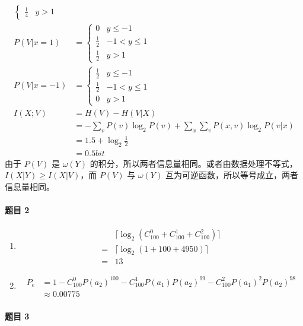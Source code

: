 \documentclass{ctexart}
\begin{document}
\begin{enumerate}
\begin{align}
\begin{cases}
            \frac{1}{4} & y > 1
        \end{cases} \\
        P(V|x=1) &= \begin{cases}
            0 & y \le -1 \\
            \frac{1}{2} & -1 < y \le 1 \\
            \frac{1}{2} & y > 1
        \end{cases} \\
        P(V|x=-1) &= \begin{cases}
            \frac{1}{2} & y \le -1 \\
            \frac{1}{2} & -1 < y \le 1 \\
            0 & y > 1
        \end{cases} \\
        I(X; V) &= H(V) - H(V|X) \\
        &= -\sum_v P(v)\log_2 P(v) + \sum_x\sum_v P(x, v)\log_2 P(v|x) \\
        &= 1.5 + \log_2\frac{1}{2} \\
        &= 0.5 bit
    \end{align}
    由于 $P(V)$ 是 $\omega(Y)$ 的积分，所以两者信息量相同。或者由数据处理不等式，$I(X|Y) \ge I(X|V)$，而 $P(V)$ 与 $\omega(Y)$ 互为可逆函数，所以等号成立，两者信息量相同。
\end{enumerate}

\paragraph{题目 2}

\begin{enumerate}
    \item\begin{align}
        & \lceil\log_2 (C_{100}^0 + C_{100}^1 + C_{100}^2)\rceil \\
        =& \lceil\log_2 (1 + 100 + 4950)\rceil \\
        =& 13
    \end{align}
    \item\begin{align}
        P_e &= 1 - C_{100}^0 P(a_2)^{100} - C_{100}^1 P(a_1)P(a_2)^{99} - C_{100}^2 P(a_1)^2P(a_2)^{98} \\
        &\approx 0.00775
    \end{align}
\end{enumerate}

\paragraph{题目 3}
\end{document}
